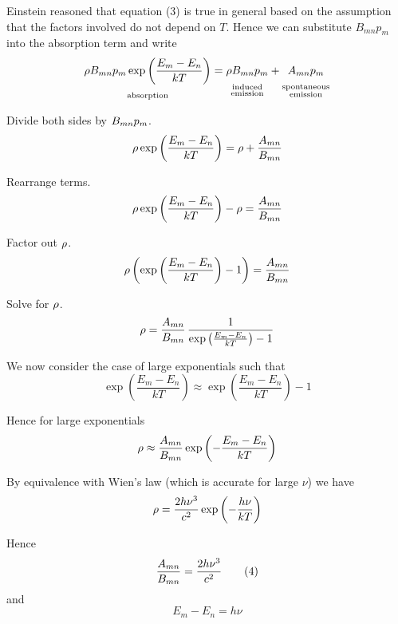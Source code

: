 \documentclass[12pt]{article}
\begin{document}
Einstein reasoned that equation (3) is true in general based on the assumption that
the factors involved do not depend on $T$.
Hence we can substitute $B_{mn}p_m$ into the absorption term and write
\begin{equation*}
\underset{\ABSORPTION}{\RHO\BMN p_m\exp\left(\frac{E_m-E_n}{kT}\right)}
=\underset{\INDUCED}{\RHO\BMN p_m}
+\underset{\SPONTANEOUS}{\AMN p_m}
\end{equation*}

Divide both sides by $B_{mn} p_m$.
\begin{equation*}
\rho\exp\left(\frac{E_m-E_n}{kT}\right)
=\rho+\frac{A_{mn}}{B_{mn}}
\end{equation*}

Rearrange terms.
\begin{equation*}
\rho\exp\left(\frac{E_m-E_n}{kT}\right)
-\rho=\frac{A_{mn}}{B_{mn}}
\end{equation*}

Factor out $\rho$.
\begin{equation*}
\rho\left(\exp\left(\frac{E_m-E_n}{kT}\right)-1\right)
=\frac{A_{mn}}{B_{mn}}
\end{equation*}

Solve for $\rho$.
\begin{equation*}
\rho
=\frac{A_{mn}}{B_{mn}}\,\frac{1}{\exp\left(\frac{E_m-E_n}{kT}\right)-1}
\end{equation*}

We now consider the case of large exponentials such that
\begin{equation*}
\exp\left(\frac{E_m-E_n}{kT}\right)\approx\exp\left(\frac{E_m-E_n}{kT}\right)-1
\end{equation*}

Hence for large exponentials
\begin{equation*}
\rho\approx
\frac{A_{mn}}{B_{mn}}\exp\left(-\frac{E_m-E_n}{kT}\right)
\end{equation*}

By equivalence with Wien's law (which is accurate for large $\nu$) we have
\begin{equation*}
\rho=\frac{2h\nu^3}{c^2}\exp\left(-\frac{h\nu}{kT}\right)
\end{equation*}

Hence
\begin{equation*}
\frac{A_{mn}}{B_{mn}}=\frac{2h\nu^3}{c^2}
\tag{4}
\end{equation*}
and
\begin{equation*}
E_m-E_n=h\nu
\end{equation*}
\end{document}
